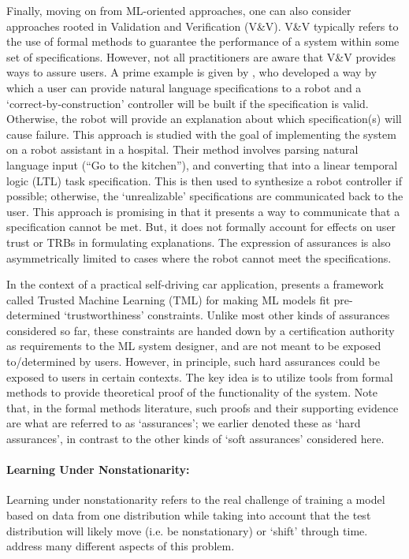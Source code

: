 Finally, moving on from ML-oriented approaches, one can also consider approaches rooted in Validation and Verification (V\&V). V\&V typically refers to the use of formal methods to guarantee the performance of a system within some set of specifications. However, not all practitioners are aware that V\&V provides ways to assure users. A prime example is given by \citet{Raman2013-mz}, who developed a way by which a user can provide natural language specifications to a robot and a `correct-by-construction' controller will be built if the specification is valid. Otherwise, the robot will provide an explanation about which specification(s) will cause failure. This approach is studied with the goal of implementing the system on a robot assistant in a hospital. Their method involves parsing natural language input (``Go to the kitchen''), and converting that into a linear temporal logic (LTL) task specification. This is then used to synthesize a robot controller if possible; otherwise, the `unrealizable' specifications are communicated back to the user. This approach is promising in that it presents a way to communicate that a specification cannot be met. But, it does not formally account for effects on user trust or TRBs in formulating explanations. The expression of assurances is also asymmetrically limited to cases where the robot cannot meet the specifications. 

In the context of a practical self-driving car application, \citet{Ghosh2016-dl} presents a framework called Trusted Machine Learning (TML) for making ML models fit pre-determined `trustworthiness' constraints. Unlike most other kinds of assurances considered so far, these constraints are handed down by a certification authority as requirements to the ML system designer, and are not meant to be exposed to/determined by users. However, in principle, such hard assurances could be exposed to users in certain contexts. The key idea is to utilize tools from formal methods to provide theoretical proof of the functionality of the system. Note that, in the formal methods literature, such proofs and their supporting evidence are what are referred to as `assurances'; we earlier denoted these as `hard assurances', in contrast to the other kinds of `soft assurances' considered here. 

\paragraph{Learning Under Nonstationarity:}
Learning under nonstationarity refers to the real challenge of training a model based on data from one distribution while taking into account that the test distribution will likely move (i.e. be nonstationary) or `shift' through time. \citet{Quinonero-Candela2009-fj} address many different aspects of this problem.

